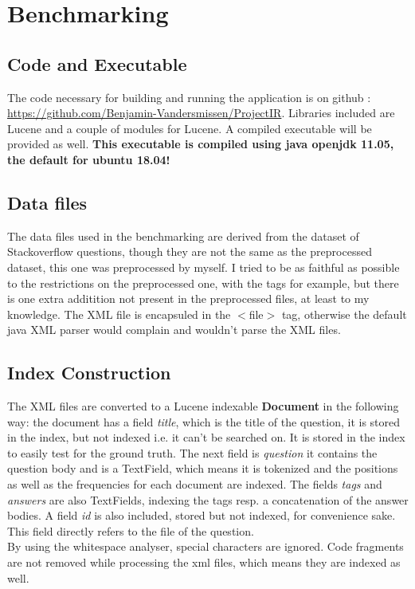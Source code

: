 \documentclass{article}
\begin{document}
\section{Benchmarking}
\subsection{Code and Executable}
The code necessary for building and running the application is on github : \url{https://github.com/Benjamin-Vandersmissen/ProjectIR}. Libraries included are Lucene and a couple of modules for Lucene. A compiled executable will be provided as well. \textbf{This executable is compiled using java openjdk 11.05, the default for ubuntu 18.04!}

\subsection{Data files}
The data files used in the benchmarking are derived from the dataset of Stackoverflow questions, though they are not the same as the preprocessed dataset, this one was preprocessed by myself. I tried to be as faithful as possible to the restrictions on the preprocessed one, with the tags for example, but there is one extra additition not present in the preprocessed files, at least to my knowledge. The XML file is encapsuled in the $<$file$>$ tag, otherwise the default java XML parser would complain and wouldn't parse the XML files.

\subsection{Index Construction}
The XML files are converted to a Lucene indexable \textbf{Document} in the following way: the document has a field \textit{title}, which is the title of the question, it is stored in the index, but not indexed i.e. it can't be searched on. It is stored in the index to easily test for the ground truth. The next field is \textit{question} it contains the question body and is a TextField, which means it is tokenized and the positions as well as the frequencies for each document are indexed. The fields \textit{tags} and \textit{answers} are also TextFields, indexing the tags resp. a concatenation of the answer bodies. A field \textit{id} is also included, stored but not indexed, for convenience sake. This field directly refers to the file of the question.\\

By using the whitespace analyser, special characters are ignored. Code fragments are not removed while processing the xml files, which means they are indexed as well.
\end{document}
